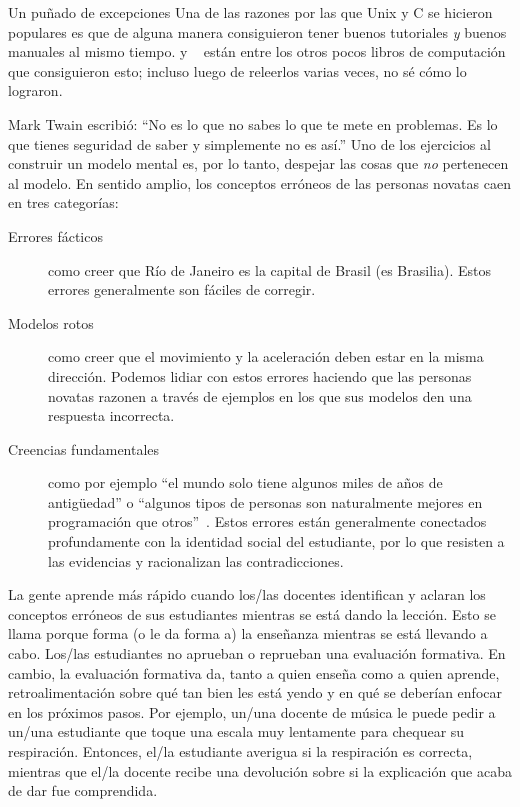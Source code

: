 \begin{aside}{Un puñado de excepciones}
  Una de las razones por las que Unix y C se hicieron populares es que 
  \cite{Kern1978,Kern1983,Kern1988}
  de alguna manera consiguieron tener buenos tutoriales \emph{y} buenos manuales al mismo tiempo.
  \cite{Fehi2008} y ~\cite{Ray2014} están entre los otros pocos libros de computación que consiguieron esto; incluso luego de releerlos varias veces, no sé cómo lo lograron.
\end{aside}


Mark Twain escribió: 
``No es lo que no sabes lo que te mete en problemas.
Es lo que tienes seguridad de saber y simplemente no es así.''
Uno de los ejercicios al construir un modelo mental es, por lo tanto,
despejar las cosas que \emph{no} pertenecen al modelo.
En sentido amplio,
los conceptos erróneos de las personas novatas caen en tres categorías:

\begin{description}

\item[Errores fácticos]
  como creer que Río de Janeiro es la capital de Brasil (es Brasilia).
Estos errores generalmente son fáciles de corregir.

\item[Modelos rotos]
  como creer que el movimiento y la aceleración deben estar en la misma dirección.
Podemos lidiar con estos errores haciendo que las personas novatas razonen a través de ejemplos
en los que sus modelos den una respuesta incorrecta.

\item[Creencias fundamentales]
  como por ejemplo ``el mundo solo tiene algunos miles de años de antigüedad''
  o ``algunos tipos de personas son naturalmente mejores en programación que otros''~\cite{Guzd2015b,Pati2016}.
  Estos errores están generalmente conectados profundamente con la identidad social del estudiante, 
  por lo que resisten a las evidencias y racionalizan las contradicciones.

\end{description}

La gente aprende más rápido cuando los/las docentes identifican y aclaran los conceptos erróneos de sus estudiantes mientras se está dando la lección.
Esto se llama 
porque forma (o le da forma a) la enseñanza mientras se está llevando a cabo.
Los/las estudiantes no aprueban o reprueban una evaluación formativa.
En cambio,
la evaluación formativa da, tanto a quien enseña como a quien aprende, retroalimentación sobre qué tan bien les está yendo y en qué se deberían enfocar en los próximos pasos.
Por ejemplo,
un/una docente de música le puede pedir a un/una estudiante que toque una escala muy lentamente para chequear su respiración.
Entonces, el/la estudiante averigua si la respiración es correcta, mientras que el/la docente recibe una devolución sobre si la explicación que acaba de dar fue comprendida.

